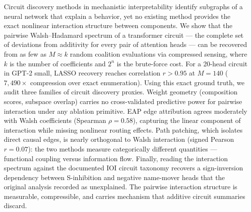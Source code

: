 
Circuit discovery methods in mechanistic interpretability identify
subgraphs of a neural network that explain a behavior, yet no existing
method provides the exact nonlinear interaction structure between
components. We show that the pairwise Walsh--Hadamard spectrum of a
transformer circuit --- the complete set of deviations from additivity
for every pair of attention heads --- can be recovered from as few as
$M \approx k$ random coalition evaluations via compressed sensing, where
$k$ is the number of coefficients and $2^n$ is the brute-force cost.
For a 20-head circuit in GPT-2 small, LASSO recovery reaches
correlation $r > 0.95$ at $M = 140$ ($7{,}490\times$ compression over
exact enumeration). Using this exact ground truth, we audit three
families of circuit discovery proxies. Weight geometry (composition
scores, subspace overlap) carries no cross-validated predictive power
for pairwise interaction under any ablation primitive. EAP edge
attribution agrees moderately with Walsh coefficients (Spearman
$\rho = 0.58$), capturing the linear component of interaction while
missing nonlinear routing effects. Path patching, which isolates direct
causal edges, is nearly orthogonal to Walsh interaction (signed Pearson
$r = 0.07$): the two methods measure categorically different quantities
--- functional coupling versus information flow. Finally, reading the
interaction spectrum against the documented IOI circuit taxonomy recovers
a sign-inversion dependency between S-inhibition and negative name-mover
heads that the original analysis recorded as unexplained. The pairwise
interaction structure is measurable, compressible, and carries mechanism
that additive circuit summaries discard.
